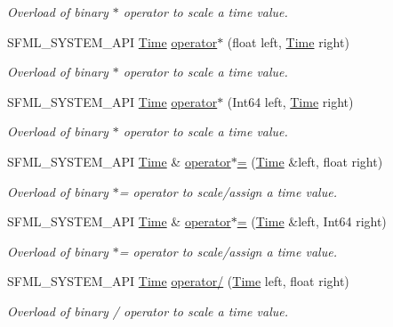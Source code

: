 \begin{DoxyCompactItemize}
\begin{DoxyCompactList}\small\item\em Overload of binary $\ast$ operator to scale a time value. \end{DoxyCompactList}\item 
S\+F\+M\+L\+\_\+\+S\+Y\+S\+T\+E\+M\+\_\+\+A\+P\+I \hyperlink{classsf_1_1_time}{Time} \hyperlink{classsf_1_1_time_a63723c9e9c5ff6151377ec4350c6f36e}{operator$\ast$} (float left, \hyperlink{classsf_1_1_time}{Time} right)
\begin{DoxyCompactList}\small\item\em Overload of binary $\ast$ operator to scale a time value. \end{DoxyCompactList}\item 
S\+F\+M\+L\+\_\+\+S\+Y\+S\+T\+E\+M\+\_\+\+A\+P\+I \hyperlink{classsf_1_1_time}{Time} \hyperlink{classsf_1_1_time_a40a6d0938fb4a43731d54fd90bfc6476}{operator$\ast$} (Int64 left, \hyperlink{classsf_1_1_time}{Time} right)
\begin{DoxyCompactList}\small\item\em Overload of binary $\ast$ operator to scale a time value. \end{DoxyCompactList}\item 
S\+F\+M\+L\+\_\+\+S\+Y\+S\+T\+E\+M\+\_\+\+A\+P\+I \hyperlink{classsf_1_1_time}{Time} \& \hyperlink{classsf_1_1_time_a8996b6a6fcb8f3854b486b8e43949b50}{operator$\ast$=} (\hyperlink{classsf_1_1_time}{Time} \&left, float right)
\begin{DoxyCompactList}\small\item\em Overload of binary $\ast$= operator to scale/assign a time value. \end{DoxyCompactList}\item 
S\+F\+M\+L\+\_\+\+S\+Y\+S\+T\+E\+M\+\_\+\+A\+P\+I \hyperlink{classsf_1_1_time}{Time} \& \hyperlink{classsf_1_1_time_a6656a0a1a1802009a72d93fbba61f24a}{operator$\ast$=} (\hyperlink{classsf_1_1_time}{Time} \&left, Int64 right)
\begin{DoxyCompactList}\small\item\em Overload of binary $\ast$= operator to scale/assign a time value. \end{DoxyCompactList}\item 
S\+F\+M\+L\+\_\+\+S\+Y\+S\+T\+E\+M\+\_\+\+A\+P\+I \hyperlink{classsf_1_1_time}{Time} \hyperlink{classsf_1_1_time_a3386c392dbc62e51dfa59730854d1ed2}{operator/} (\hyperlink{classsf_1_1_time}{Time} left, float right)
\begin{DoxyCompactList}\small\item\em Overload of binary / operator to scale a time value. \end{DoxyCompactList}\item 

\end{DoxyCompactItemize}
